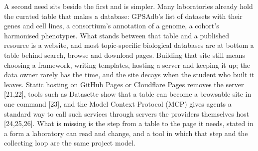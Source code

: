 \documentclass[11pt,a4paper]{article}
\begin{document}
A second need sits beside the first and is simpler. Many laboratories
already hold the curated table that makes a database: GPSAdb's list of
datasets with their genes and cell lines, a consortium's annotation of a
genome, a cohort's harmonised phenotypes. What stands between that table
and a published resource is a website, and most topic-specific
biological databases are at bottom a table behind search, browse and
download pages. Building that site still means choosing a framework,
writing templates, hosting a server and keeping it up; the data owner
rarely has the time, and the site decays when the student who built it
leaves. Static hosting on GitHub Pages or Cloudflare Pages removes the
server {[}21,22{]}, tools such as Datasette show that a table can become
a browsable site in one command {[}23{]}, and the Model Context Protocol
(MCP) gives agents a standard way to call such services through servers
the providers themselves host {[}24,25,26{]}. What is missing is the
step from a table to the page it needs, stated in a form a laboratory
can read and change, and a tool in which that step and the collecting
loop are the same project model.
\end{document}
